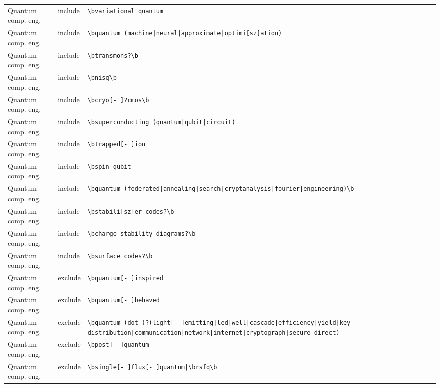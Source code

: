 \documentclass[10pt]{article}
\begin{document}
\begin{longtable}{@{}lL{1.6cm}L{11.5cm}@{}}
Quantum comp. eng. & include & \texttt{\textbackslash{}bvariational quantum} \\
Quantum comp. eng. & include & \texttt{\textbackslash{}bquantum \allowbreak(machine\allowbreak|neural\allowbreak|approximate\allowbreak|optimi[sz]ation)} \\
Quantum comp. eng. & include & \texttt{\textbackslash{}btransmons?\textbackslash{}b} \\
Quantum comp. eng. & include & \texttt{\textbackslash{}bnisq\textbackslash{}b} \\
Quantum comp. eng. & include & \texttt{\textbackslash{}bcryo[- ]?cmos\textbackslash{}b} \\
Quantum comp. eng. & include & \texttt{\textbackslash{}bsuperconducting \allowbreak(quantum\allowbreak|qubit\allowbreak|circuit)} \\
Quantum comp. eng. & include & \texttt{\textbackslash{}btrapped[- ]ion} \\
Quantum comp. eng. & include & \texttt{\textbackslash{}bspin qubit} \\
Quantum comp. eng. & include & \texttt{\textbackslash{}bquantum \allowbreak(federated\allowbreak|annealing\allowbreak|search\allowbreak|cryptanalysis\allowbreak|fourier\allowbreak|engineering)\textbackslash{}b} \\
Quantum comp. eng. & include & \texttt{\textbackslash{}bstabili[sz]er codes?\textbackslash{}b} \\
Quantum comp. eng. & include & \texttt{\textbackslash{}bcharge stability diagrams?\textbackslash{}b} \\
Quantum comp. eng. & include & \texttt{\textbackslash{}bsurface codes?\textbackslash{}b} \\
Quantum comp. eng. & exclude & \texttt{\textbackslash{}bquantum[- ]inspired} \\
Quantum comp. eng. & exclude & \texttt{\textbackslash{}bquantum[- ]behaved} \\
Quantum comp. eng. & exclude & \texttt{\textbackslash{}bquantum \allowbreak(dot )?\allowbreak(light[- ]emitting\allowbreak|led\allowbreak|well\allowbreak|cascade\allowbreak|efficiency\allowbreak|yield\allowbreak|key distribution\allowbreak|communication\allowbreak|network\allowbreak|internet\allowbreak|cryptograph\allowbreak|secure direct)} \\
Quantum comp. eng. & exclude & \texttt{\textbackslash{}bpost[- ]quantum} \\
Quantum comp. eng. & exclude & \texttt{\textbackslash{}bsingle[- ]flux[- ]quantum\allowbreak|\textbackslash{}brsfq\textbackslash{}b} \\

\end{longtable}
\end{document}
